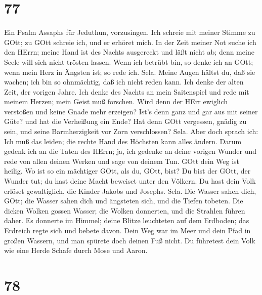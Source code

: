 \hypertarget{section-76}{%
\section{77}\label{section-76}}

 Ein Psalm Assaphs für Jeduthun, vorzusingen. 
Ich schreie mit meiner Stimme zu GOtt; zu GOtt schreie ich, und er
erhöret mich.  In der Zeit meiner Not suche ich den HErrn;
meine Hand ist des Nachts ausgereckt und läßt nicht ab; denn meine Seele
will sich nicht trösten lassen.  Wenn ich betrübt bin, so
denke ich an GOtt; wenn mein Herz in Ängsten ist; so rede ich. Sela.
 Meine Augen hältst du, daß sie wachen; ich bin so
ohnmächtig, daß ich nicht reden kann.  Ich denke der alten
Zeit, der vorigen Jahre.  Ich denke des Nachts an mein
Saitenspiel und rede mit meinem Herzen; mein Geist muß forschen.
 Wird denn der HErr ewiglich verstoßen und keine Gnade mehr
erzeigen?  Ist's denn ganz und gar aus mit seiner Güte? und
hat die Verheißung ein Ende?  Hat denn GOtt vergessen,
gnädig zu sein, und seine Barmherzigkeit vor Zorn verschlossen? Sela.
 Aber doch sprach ich: Ich muß das leiden; die rechte Hand
des Höchsten kann alles ändern.  Darum gedenk ich an die
Taten des HErrn; ja, ich gedenke an deine vorigen Wunder 
und rede von allen deinen Werken und sage von deinem Tun. 
GOtt dein Weg ist heilig. Wo ist so ein mächtiger GOtt, als du, GOtt,
bist?  Du bist der GOtt, der Wunder tut; du hast deine
Macht beweiset unter den Völkern.  Du hast dein Volk
erlöset gewaltiglich, die Kinder Jakobs und Josephs. Sela. 
Die Wasser sahen dich, GOtt; die Wasser sahen dich und ängsteten sich,
und die Tiefen tobeten.  Die dicken Wolken gossen Wasser;
die Wolken donnerten, und die Strahlen führen daher.  Es
donnerte im Himmel; deine Blitze leuchteten auf dem Erdboden; das
Erdreich regte sich und bebete davon.  Dein Weg war im Meer
und dein Pfad in großen Wassern, und man spürete doch deinen Fuß nicht.
 Du führetest dein Volk wie eine Herde Schafe durch Mose
und Aaron.

\hypertarget{section-77}{%
\section{78}\label{section-77}}

